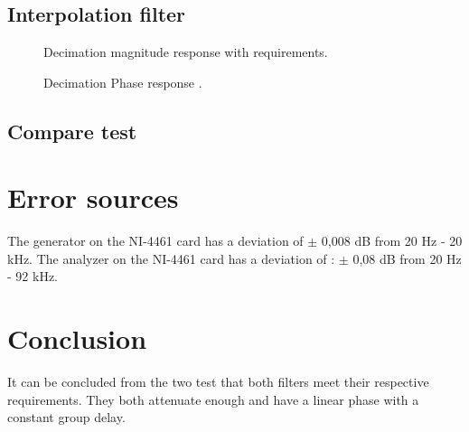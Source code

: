 \subsection*{Interpolation filter}

\begin{figure}[H]
	\centering
	
	\caption{Decimation magnitude response with requirements.}
	\label{fig:acceptIntMag}
\end{figure}
\begin{figure}[H]
	\centering
	
	\caption{Decimation Phase response .}
	\label{fig:AcceptIntPhase}
\end{figure}


\subsection*{Compare test}


\section{Error sources}
The generator on the NI-4461 card has a deviation of $\pm$ 0,008 dB from 20 Hz - 20 kHz. The analyzer on the NI-4461 card has a deviation of : $\pm$ 0,08 dB from 20 Hz - 92 kHz. 

\section{Conclusion}
It can be concluded from the two test that both filters meet their respective requirements. They both attenuate enough and have a linear phase with a constant group delay.
